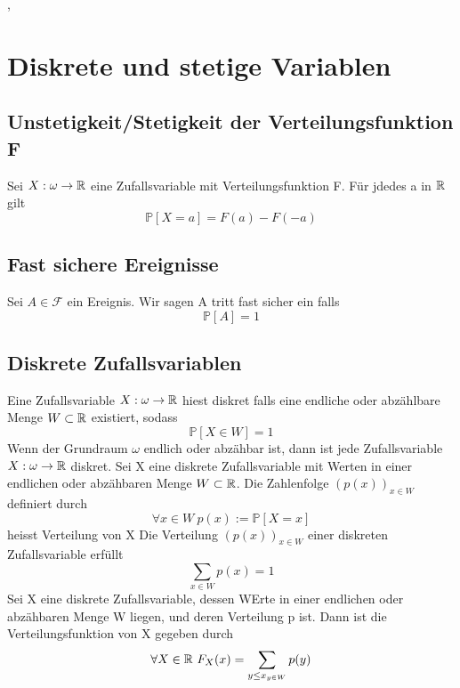 \sep
\section{Diskrete und stetige Variablen}
\subsection{Unstetigkeit/Stetigkeit der Verteilungsfunktion F}
 \newline
Sei \( X : \omega \rightarrow \mathbb{R} \) eine Zufallsvariable mit Verteilungsfunktion F. Für jdedes a in \(\mathbb{R}\) gilt \[ \mathbb{P}[X = a] = F(a) - F(-a)\]
\subsection{Fast sichere Ereignisse}
\Def[3.2] \newline
Sei \( A \in \mathcal{F} \) ein Ereignis. Wir sagen A tritt fast sicher ein falls \[ \mathbb{P}[A] = 1\]
\subsection{Diskrete Zufallsvariablen}
 \newline
Eine Zufallsvariable \( X : \omega \rightarrow \mathbb{R} \) hiest diskret falls eine endliche oder abzählbare Menge \( W \subset \mathbb{R}\) existiert, sodass \[ \mathbb{P}[X \in W ] = 1\]
\Bem[3.5] Wenn der Grundraum \( \omega\) endlich oder abzähbar ist, dann ist jede Zufallsvariable \( X : \omega \rightarrow \mathbb{R}\) diskret. \newline
{} \newline
Sei X eine diskrete Zufallsvariable mit Werten in einer endlichen oder abzähbaren Menge \( W \subset \mathbb{R}\). Die Zahlenfolge \((p(x))_{x \in W}\) definiert durch \[ \forall x \in W \ p(x) := \mathbb{P}[X = x]\] heisst Verteilung von X \newline
\Satz[3.7] Die Verteilung \((p(x))_{x \in W}\) einer diskreten Zufallsvariable erfüllt \[ \sum_{x \in W} p(x) = 1\]
\Satz[3.9] Sei X eine diskrete Zufallsvariable, dessen WErte in einer endlichen oder abzähbaren Menge W liegen, und deren Verteilung p ist. Dann ist die Verteilungsfunktion von X gegeben durch \[ \forall X \in \mathbb{R} \ F_X(x) = \sum_{y \leq x_{y \in W}}p(y)\]
